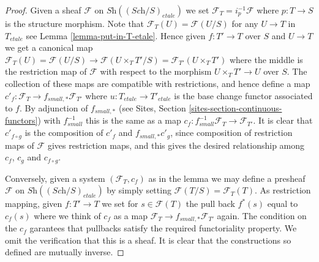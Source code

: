\begin{proof}
Given a sheaf $\mathcal{F}$ on $\textit{Sh}((\textit{Sch}/S)_{etale})$
we set $\mathcal{F}_T = i_p^{-1}\mathcal{F}$ where $p : T \to S$
is the structure morphism. Note that
$\mathcal{F}_T(U) = \mathcal{F}(U/S)$ for any $U \to T$
in $T_{etale}$ see Lemma \ref{lemma-put-in-T-etale}.
Hence given $f : T' \to T$ over $S$ and $U \to T$ we get a canonical
map $\mathcal{F}_T(U) = \mathcal{F}(U/S) \to \mathcal{F}(U\times_TT'/S)
= \mathcal{F}_{T'}(U\times_T T')$ where the middle is the restriction map
of $\mathcal{F}$ with respect to the morphism
$U \times_TT' \to U$ over $S$. The collection of these maps are
compatible with restrictions, and hence define a map
$c'_f : \mathcal{F}_T \to f_{small, *}\mathcal{F}_{T'}$ where
$u : T_{etale} \to T'_{etale}$ is the base change functor associated
to $f$. By adjunction of $f_{small, *}$ (see
Sites, Section \ref{sites-section-continuous-functors}) with
$f_{small}^{-1}$ this is the same as a map
$c_f : f_{small}^{-1}\mathcal{F}_T \to \mathcal{F}_{T'}$.
It is clear that $c'_{f \circ g}$ is the composition of
$c'_f$ and $f_{small, *}c'_g$, since composition of restriction maps
of $\mathcal{F}$ gives restriction maps, and this gives the desired
relationship among $c_f$, $c_g$ and $c_{f \circ g}$.

\medskip\noindent
Conversely, given a system $(\mathcal{F}_T, c_f)$ as in the lemma
we may define a presheaf $\mathcal{F}$ on
$\textit{Sh}((\textit{Sch}/S)_{etale})$
by simply setting $\mathcal{F}(T/S) = \mathcal{F}_T(T)$. As restriction
mapping, given $f : T' \to T$ we set for $s \in \mathcal{F}(T)$
the pull back $f^*(s)$ equal to $c_f(s)$ where we think of $c_f$ as
a map $\mathcal{F}_T \to f_{small, *}\mathcal{F}_{T'}$ again.
The condition on the $c_f$ garantees that
pullbacks satisfy the required functoriality property.
We omit the verification that this is a sheaf.
It is clear that the constructions so defined are mutually inverse.
\end{proof}

















































